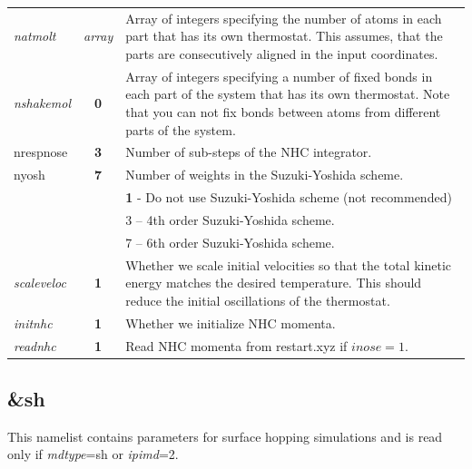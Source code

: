 \begin{tabularx}{\textwidth}{lcX}
\textit{natmolt} & \textit{array}& Array of integers specifying the number of atoms in each part that has its own thermostat.
This assumes, that the parts are consecutively aligned in the input coordinates.  \\

\textit{nshakemol} & \textbf{0} & Array of integers specifying a number of fixed bonds in each part of the system that has its own thermostat.
Note that you can not fix bonds between atoms from different parts of the system. \\

\colorbox{black!20}{nrespnose} & \textbf{3} & Number of sub-steps of the NHC integrator.\cite{Tuckerman_book} \\

\colorbox{black!20}{nyosh} & \textbf{7} & Number of weights in the Suzuki-Yoshida scheme.\cite{Tuckerman_book} \\
& & \textbf{1} - Do not use Suzuki-Yoshida scheme (not recommended) \\
& & 3 -- 4th order Suzuki-Yoshida scheme.\\
& & 7 -- 6th order Suzuki-Yoshida scheme.\\  


\colorbox{black!20}{\textit{scaleveloc}} & \textbf{1} & Whether we scale initial velocities so that the total kinetic energy
matches the desired temperature. This should reduce the initial oscillations of the thermostat. \\ 

\colorbox{black!20}{\textit{initnhc}} & \textbf{1} & Whether we initialize NHC momenta. \\ 

\colorbox{black!20}{\textit{readnhc}} & \textbf{1} & Read NHC momenta from restart.xyz if $inose=1$. \\ 

\hline
\end{tabularx}


\newpage
\subsection{\&sh}
This namelist contains parameters for surface hopping simulations and is read only if \textit{mdtype}=sh or \textit{ipimd}=2.
 
